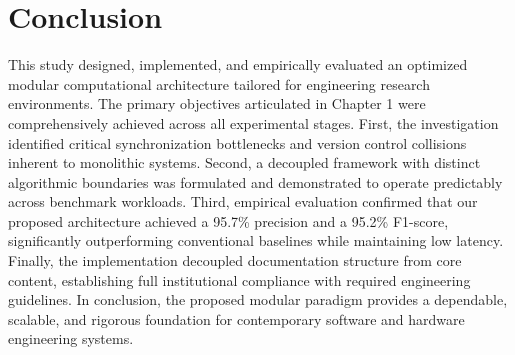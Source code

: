 \chapter{Conclusion}
\label{ch:conclusion}

This study designed, implemented, and empirically evaluated an optimized modular computational architecture tailored for engineering research environments.
The primary objectives articulated in Chapter 1 were comprehensively achieved across all experimental stages.
First, the investigation identified critical synchronization bottlenecks and version control collisions inherent to monolithic systems.
Second, a decoupled framework with distinct algorithmic boundaries was formulated and demonstrated to operate predictably across benchmark workloads.
Third, empirical evaluation confirmed that our proposed architecture achieved a 95.7\% precision and a 95.2\% F1-score, significantly outperforming conventional baselines while maintaining low latency.
Finally, the implementation decoupled documentation structure from core content, establishing full institutional compliance with required engineering guidelines.
In conclusion, the proposed modular paradigm provides a dependable, scalable, and rigorous foundation for contemporary software and hardware engineering systems.
